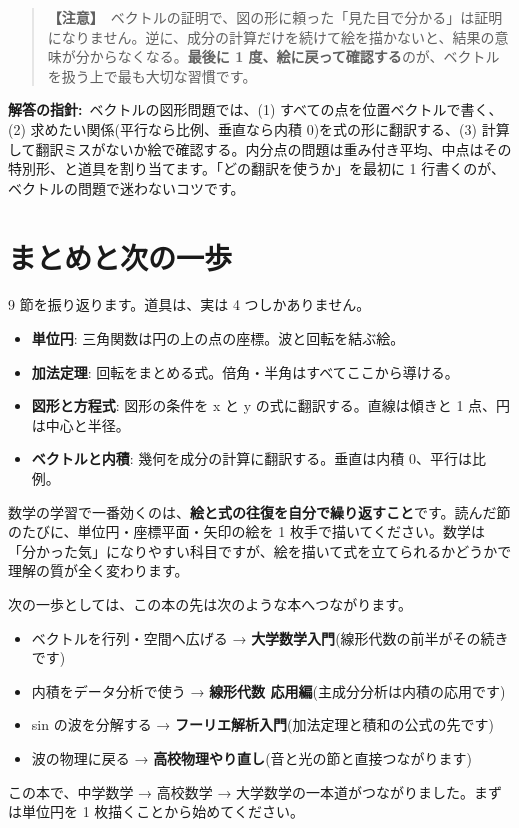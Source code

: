 \documentclass{article}
\begin{document}
\begin{quote}
\textbf{【注意】}\ ベクトルの証明で、図の形に頼った「見た目で分かる」は証明になりません。逆に、成分の計算だけを続けて絵を描かないと、結果の意味が分からなくなる。\textbf{最後に 1 度、絵に戻って確認する}のが、ベクトルを扱う上で最も大切な習慣です。
\end{quote}

\textbf{解答の指針:}\ ベクトルの図形問題では、(1) すべての点を位置ベクトルで書く、(2) 求めたい関係(平行なら比例、垂直なら内積 0)を式の形に翻訳する、(3) 計算して翻訳ミスがないか絵で確認する。内分点の問題は重み付き平均、中点はその特別形、と道具を割り当てます。「どの翻訳を使うか」を最初に 1 行書くのが、ベクトルの問題で迷わないコツです。

\section{まとめと次の一歩}

9 節を振り返ります。道具は、実は 4 つしかありません。

\begin{itemize}
\item \textbf{単位円}: 三角関数は円の上の点の座標。波と回転を結ぶ絵。
\item \textbf{加法定理}: 回転をまとめる式。倍角・半角はすべてここから導ける。
\item \textbf{図形と方程式}: 図形の条件を x と y の式に翻訳する。直線は傾きと 1 点、円は中心と半径。
\item \textbf{ベクトルと内積}: 幾何を成分の計算に翻訳する。垂直は内積 0、平行は比例。
\end{itemize}

数学の学習で一番効くのは、\textbf{絵と式の往復を自分で繰り返すこと}です。読んだ節のたびに、単位円・座標平面・矢印の絵を 1 枚手で描いてください。数学は「分かった気」になりやすい科目ですが、絵を描いて式を立てられるかどうかで理解の質が全く変わります。

次の一歩としては、この本の先は次のような本へつながります。

\begin{itemize}
\item ベクトルを行列・空間へ広げる → \textbf{大学数学入門}(線形代数の前半がその続きです)
\item 内積をデータ分析で使う → \textbf{線形代数 応用編}(主成分分析は内積の応用です)
\item sin の波を分解する → \textbf{フーリエ解析入門}(加法定理と積和の公式の先です)
\item 波の物理に戻る → \textbf{高校物理やり直し}(音と光の節と直接つながります)
\end{itemize}

この本で、中学数学 → 高校数学 → 大学数学の一本道がつながりました。まずは単位円を 1 枚描くことから始めてください。
\end{document}
